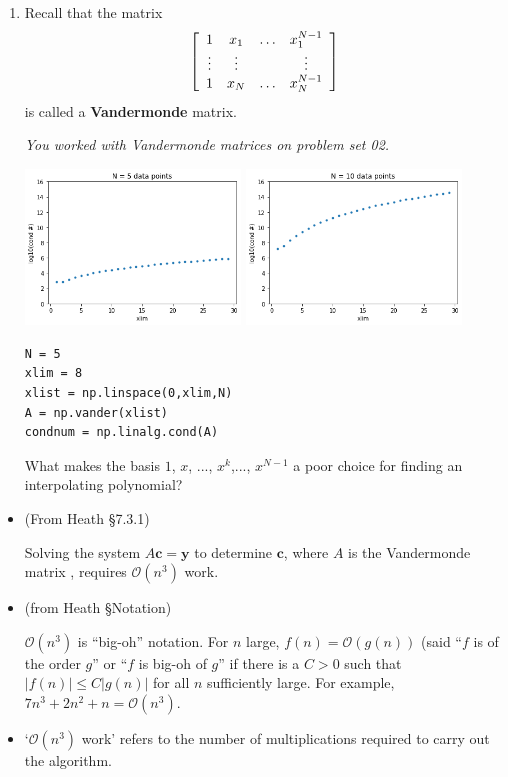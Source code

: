 \documentclass[12pt,letterpaper,noanswers]{exam}
\newcommand{\vc}[1]{\boldsymbol{#1}}
\begin{document}
\begin{enumerate}[resume=classQ]
\item Recall that the matrix \[\left[\begin{array}{c c c c}
1 & x_1 & \hdots & x_1^{N-1} \\
\vdots & \vdots & & \vdots \\
1 & x_N & \hdots & x_N^{N-1}
\end{array}\right]\] is called a \textbf{Vandermonde} matrix.  

\emph{You worked with Vandermonde matrices on problem set 02.} 

\includegraphics[width=0.45\textwidth]{img/Class08vandermonde5.png}
\includegraphics[width=0.45\textwidth]{img/Class08vandermonde10.png}

\begin{verbatim}
N = 5
xlim = 8
xlist = np.linspace(0,xlim,N)
A = np.vander(xlist)
condnum = np.linalg.cond(A)
\end{verbatim}

What makes the basis $1$, $x$, ..., $x^k$,..., $x^{N-1}$ a poor choice for finding an interpolating polynomial?
\vspace{1in}
\end{enumerate}

\begin{tcolorbox}
\begin{itemize}
\itemsep0pt
    \item (From Heath \S 7.3.1)
    
    Solving the system $A\vc{c} = \vc{y}$ to determine $\vc{c}$, where $A$ is the Vandermonde matrix , requires $\mathcal{O}(n^3)$ work.
    \item (from Heath \S Notation)
    
    $\mathcal{O}(n^3)$ is ``big-oh'' notation.  For $n$ large, $f(n) = \mathcal{O}(g(n))$ (said ``$f$ is of the order $g$'' or ``$f$ is big-oh of $g$'' if there is a $C>0$ such that $\vert f(n)\vert \leq C\vert g(n)\vert$ for all $n$ sufficiently large.  For example, $7n^3 + 2n^2 + n = \mathcal{O}(n^3)$.
    
    \item `$\mathcal{O}(n^3)$ work' refers to the number of multiplications required to carry out the algorithm.
\end{itemize}
\end{tcolorbox}
\end{document}
